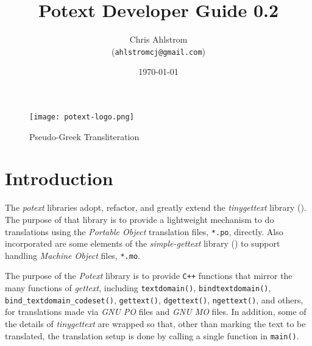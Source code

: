 \documentclass[
 11pt,
 twoside,
 a4paper,
 final                                 %
]{article}
\begin{document}
\title{Potext Developer Guide 0.2}
\author{Chris Ahlstrom \\
   (\texttt{ahlstromcj@gmail.com})}
\date{\today}
\maketitle

\begin{figure}[H]
   \centering 
   \texttt{[image: potext-logo.png]}
   \caption*{Pseudo-Greek Transliteration}
\end{figure}

\clearpage                             %

\tableofcontents
\listoffigures                         %

%

\parindent 0pt
\parskip 9pt

\rhead{\rightmark}         %

\section{Introduction}
\label{sec:introduction}

   The \textsl{potext} libraries adopt, refactor, and greatly extend the
   \textsl{tinygettext} library (\cite{tinygettext}).
   The purpose of that library is to provide a lightweight mechanism
   to do translations using the
   \textsl{Portable Object} translation files, \texttt{*.po}, directly.
   Also incorporated are some elements of the
   \textsl{simple-gettext} library (\cite{simplegettext})
   to support handling \textsl{Machine Object} files, \texttt{*.mo}.

   The purpose of the \textsl{Potext} library is to provide \texttt{C++}
   functions that mirror the many functions of \textsl{gettext},
   including 
   \texttt{textdomain()},
   \texttt{bindtextdomain()},
   \texttt{bind\_textdomain\_codeset()},
   \texttt{gettext()},
   \texttt{dgettext()},
   \texttt{ngettext()},
   and others, for translations made via
   \textsl{GNU PO} files and
   \textsl{GNU MO} files.
   In addition, some of the details of \textsl{tinygettext} 
   are wrapped so that, other than marking the text to be translated,
   the translation setup is done by calling a single function in
   \texttt{main()}.
\end{document}
